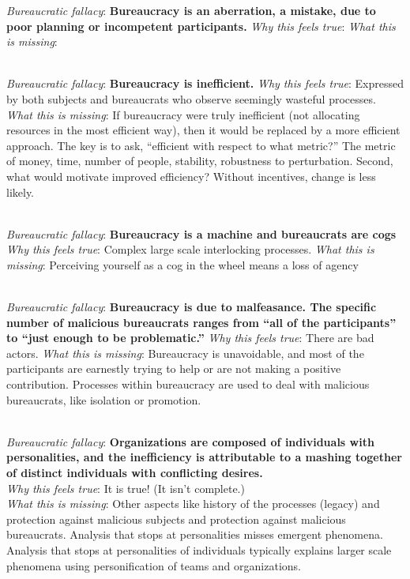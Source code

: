 \textit{Bureaucratic fallacy}: \textbf{Bureaucracy is an aberration, a mistake, due to poor planning or incompetent participants.}
\textit{Why this feels true}: 
\textit{What this is missing}: 

\ \\

\textit{Bureaucratic fallacy}: \textbf{Bureaucracy is inefficient.}
\textit{Why this feels true}: Expressed by both subjects and bureaucrats who observe seemingly wasteful processes. 
\textit{What this is missing}: If bureaucracy were truly inefficient (not allocating resources in the most efficient way), then it would be replaced by a more efficient approach. The key is to ask, ``efficient with respect to what metric?'' The metric of money, time, number of people, stability, robustness to perturbation.  Second, what would motivate improved efficiency? Without incentives, change is less likely. 

\ \\

\textit{Bureaucratic fallacy}: \textbf{Bureaucracy is a machine and bureaucrats are cogs}
\textit{Why this feels true}: Complex large scale interlocking processes.
\textit{What this is missing}: Perceiving yourself as a cog in the wheel means a loss of agency


\ \\

\textit{Bureaucratic fallacy}: \textbf{Bureaucracy is due to malfeasance. The specific number of malicious bureaucrats ranges from ``all of the participants'' to ``just enough to be problematic.''} 
\textit{Why this feels true}: There are bad actors. 
\textit{What this is missing}: Bureaucracy is unavoidable, and most of the participants are earnestly trying to help or are not making a positive contribution. Processes within bureaucracy are used to deal with malicious bureaucrats, like isolation or promotion. 

\ \\

\textit{Bureaucratic fallacy}: \textbf{Organizations are composed of individuals with personalities, and the inefficiency is attributable to a mashing together of distinct individuals with conflicting desires.} \\
\textit{Why this feels true}: It is true! (It isn't complete.) \\
\textit{What this is missing}: Other aspects like history of the processes (legacy) and protection against malicious subjects and protection against malicious bureaucrats. Analysis that stops at personalities misses emergent phenomena. Analysis that stops at personalities of individuals typically explains larger scale phenomena using personification of teams and organizations. 



